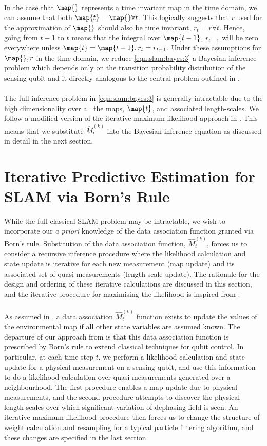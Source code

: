   \\
  In the case that $\map{}$ represents a time invariant map in the time domain, we can assume that both $\map{t} = \map{} \forall t$, This logically suggests that $r$ used for the approximation of $\map{}$ should also be time invariant, $r_t = r \forall t$. Hence, going from $t-1$ to $t$ means that the integral over $\map{t-1}$, $r_{t-1}$ will be zero everywhere unless $\map{t}=\map{t-1}, r_t = r_{t-1}$. Under these assumptions for $\map{}, r$ in the time domain, we reduce \cref{eqn:slam:bayes:3} a Bayesian inference problem which depends only on the transition probability distribution of the sensing qubit and it directly analogous to the central problem outlined in \cite{thrun2001probabilistic}.\\
  \\
  The full inference problem in \cref{eqn:slam:bayes:3} is generally intractable due to the high dimensionality over all the maps, $\map{t}$, and associated length-scales. We follow a modified version of the iterative maximum likelihood approach in \cite{thrun2001probabilistic}. This means that we substitute $\hat{M}_t^{(k)}$ into the Bayesian inference equation as discussed in detail in the next section. 
  
\section{Iterative Predictive Estimation for SLAM via Born's Rule}  \label{sec:iterativebayes}
While the full classical SLAM problem may be intractable, we wish to incorporate our \textit{a priori} knowledge of the data association function granted via Born's rule. Substitution of the data association function,  $\hat{M}_t^{(k)}$, forces us to consider a recursive inference procedure where the likelihood calculation and state update is iterative for each new measurement (map update) and its associated set of quasi-measurements (length scale update). The rationale for the design and ordering of these iterative calculations are discussed in this section, and the iterative procedure for maximising the likelihood is inspired from \cite{thrun2001probabilistic}.\\
\\
As assumed in \cite{thrun2001probabilistic}, a data association $\hat{M}_t^{(k)}$ function exists to update the values of the environmental map if all other state variables are assumed known. The departure of our approach from \cite{thrun2001probabilistic} is that this data association function is prescribed by Born's rule to extend classical techniques for qubit control. In particular, at each time step $t$,  we perform a likelihood calculation and state update for a physical measurement on a sensing qubit, and use this information to do a likelihood calculation over quasi-measurements generated over a neighbourhood. The first procedure enables a map update due to physical measurements, and the second procedure attempts to discover the physical length-scales over which significant variation of dephasing field is seen.  An iterative maximum likelihood procedure then forces us to change the structure of weight calculation and resampling for a typical particle filtering algorithm, and these changes are specified in the last section.
  
